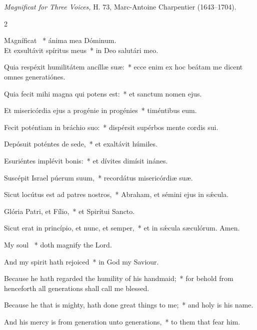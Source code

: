 \documentclass[12pt]{book}
\begin{document}
\smallskip

\begin{flushright}
\textit{Magnificat for Three Voices,} H. 73, Marc-Antoine Charpentier (1643–1704).\end{flushright}



\begin{paracol}{2}

\lettrine{M}agníficat \cc~* ánima mea Dóminum.\\ Et exsultávit spíritus meus~* in Deo salutári meo.

 Quia respéxit humilitátem ancíllæ suæ:~* ecce enim ex hoc beátam me dicent o\-mnes generatiónes.

 Quia fecit mihi magna qui potens est:~* et san\-ctum nomen ejus.

 Et misericórdia ejus a progénie in progénies~* timéntibus eum.

 Fecit poténtiam in bráchio suo:~* dispérsit supérbos mente cordis sui.

 Depósuit poténtes de sede,~* et exaltávit húmiles.

 Esuriéntes implévit bonis:~* et dívites dimísit inánes.

 Suscépit Israel púerum suum,~* recordátus misericórdiæ suæ.

 Sicut locútus est ad patres no\-stros,~* Abraham, et sémini ejus in sǽcula.

 Glória Patri, et Fílio,~* et Spirítui San\-cto.

 Sicut erat in princípio, et nunc, et semper,~* et in sǽcula sæculórum. Amen.
 
 \switchcolumn
 \begin{enpars}
My soul \cc~* doth magnify the Lord.

And my spirit hath rejoiced~* in God my Saviour.

Because he hath regarded the humility of his handmaid;~* for behold from henceforth all generations shall call me blessed.

Because he that is mighty, hath done great things to me;~* and holy is his name.

And his mercy is from generation unto generations,~* to them that fear him.


\end{enpars}
\end{paracol}
\end{document}
